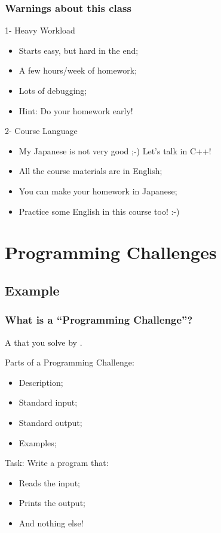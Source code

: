 \documentclass{beamer}
\begin{document}
\begin{frame}
  \frametitle{Warnings about this class}
  \begin{alertblock}{1- Heavy Workload}
    \begin{itemize}
    \item Starts easy, but hard in the end;
    \item A few hours/week of homework;
    \item Lots of debugging;

      \bigskip

    \item Hint: Do your homework early!
    \end{itemize}
  \end{alertblock}

  \begin{alertblock}{2- Course Language}
    \begin{itemize}
    \item My Japanese is not very good ;-) Let's talk in C++!
    \item All the course materials are in English;
    \item You can make your homework in Japanese;

      \bigskip

    \item Practice some English in this course too! :-)
    \end{itemize}
  \end{alertblock}

\end{frame}

\section{Programming Challenges}
\subsection{Example}

\begin{frame}
  \frametitle{What is a ``Programming Challenge''?}

  A  that you solve by .

  \bigskip

  Parts of a Programming Challenge:
  \begin{itemize}
  \item Description;
  \item Standard input;
  \item Standard output;
  \item Examples;
  \end{itemize}

  \bigskip

  Task: Write a program that:
  \begin{itemize}
    \item Reads the input;
    \item Prints the  output;
    \item And nothing else!
  \end{itemize}
\end{frame}
\end{document}
